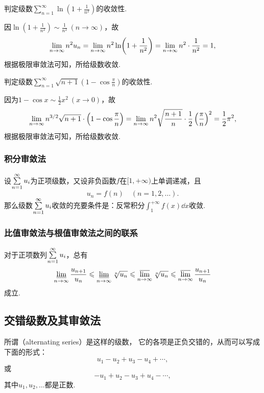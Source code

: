 \begin{example}
\def\s{\sum\limits_{n=1}^\infty }
判定级数\(\s \ln(1+\frac{1}{n^2})\)的收敛性.
\begin{solution}
因\(\ln(1+\frac{1}{n^2}) \sim \frac{1}{n^2}\ (n\to\infty)\)，故\[
\lim\limits_{n\to\infty} n^2 u_n = \lim\limits_{n\to\infty} n^2 \ln(1+\frac{1}{n^2})
= \lim\limits_{n\to\infty} n^2 \cdot \frac{1}{n^2} = 1,
\]根据极限审敛法可知，所给级数收敛.
\end{solution}
\end{example}

\begin{example}
\def\s{\sum\limits_{n=1}^\infty }
判定级数\(\s \sqrt{n+1} \left(1-\cos\frac{\pi}{n}\right)\)的收敛性.
\begin{solution}
因为\(1 - \cos x \sim \frac{1}{2} x^2\ (x\to0)\)，故\[
\lim\limits_{n\to\infty} n^{3/2} \sqrt{n+1} \cdot \left(1-\cos\frac{\pi}{n}\right)
= \lim\limits_{n\to\infty} n^2 \sqrt{\frac{n+1}{n}} \cdot \frac{1}{2} \left(\frac{\pi}{n}\right)^2
= \frac{1}{2} \pi^2,
\]根据极限审敛法可知，所给级数收敛.
\end{solution}
\end{example}

\subsubsection{积分审敛法}
\begin{theorem}[积分审敛法]\label{theorem:无穷级数.积分审敛法}
设\(\s u_i\)为正项级数，又设非负函数\(f\)在\([1,+\infty)\)上单调递减，且\[
u_n = f(n)
\quad(n=1,2,\dotsc).
\]那么级数\(\s u_i\)收敛的充要条件是：反常积分\(\int_1^{+\infty} f(x) \dd{x}\)收敛.
\end{theorem}

\subsubsection{比值审敛法与根值审敛法之间的联系}
\begin{theorem}
对于正项数列\(\s u_i\)，总有\[
\varliminf\limits_{n\to\infty} \frac{u_{n+1}}{u_n}
\leqslant
\varliminf\limits_{n\to\infty} \sqrt[n]{u_n}
\leqslant
\varlimsup\limits_{n\to\infty} \sqrt[n]{u_n}
\leqslant
\varlimsup\limits_{n\to\infty} \frac{u_{n+1}}{u_n}
\]成立.
\end{theorem}

\subsection{交错级数及其审敛法}
所谓（alternating series）是这样的级数，%
它的各项是正负交错的，从而可以写成下面的形式：\[
u_1 - u_2 + u_3 - u_4 + \dotsb,
\]或\[
-u_1 + u_2 - u_3 + u_4 - \dotsb,
\]其中\(u_1,u_2,\dotsc\)都是正数.

